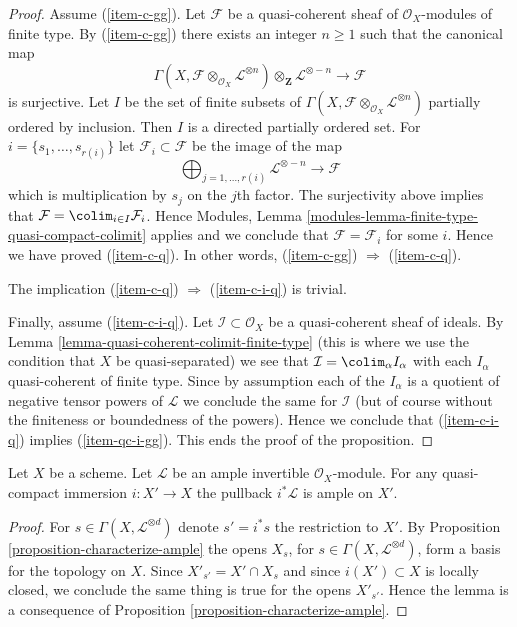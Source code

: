 \begin{proof}
\medskip\noindent
Assume (\ref{item-c-gg}). Let $\mathcal{F}$ be a quasi-coherent
sheaf of $\mathcal{O}_X$-modules of finite type.
By (\ref{item-c-gg}) there exists an integer $n \geq 1$ such that
the canonical map
$$
\Gamma(X, \mathcal{F} \otimes_{\mathcal{O}_X} \mathcal{L}^{\otimes n})
\otimes_{\mathbf{Z}} \mathcal{L}^{\otimes -n}
\longrightarrow
\mathcal{F}
$$
is surjective. Let $I$ be the set of finite subsets of
$\Gamma(X, \mathcal{F} \otimes_{\mathcal{O}_X} \mathcal{L}^{\otimes n})$
partially ordered by inclusion. Then $I$ is a directed partially ordered set.
For $i = \{s_1, \ldots, s_{r(i)}\}$ let $\mathcal{F}_i \subset \mathcal{F}$
be the image of the map
$$
\bigoplus\nolimits_{j = 1, \ldots, r(i)} \mathcal{L}^{\otimes -n}
\longrightarrow
\mathcal{F}
$$
which is multiplication by $s_j$ on the $j$th factor. The surjectivity above
implies that $\mathcal{F} = \colim_{i \in I} \mathcal{F}_i$.
Hence Modules, Lemma \ref{modules-lemma-finite-type-quasi-compact-colimit}
applies and we conclude that
$\mathcal{F} = \mathcal{F}_i$ for some $i$.
Hence we have proved (\ref{item-c-q}). In other words,
(\ref{item-c-gg}) $\Rightarrow$ (\ref{item-c-q}).

\medskip\noindent
The implication (\ref{item-c-q}) $\Rightarrow$ (\ref{item-c-i-q}) is trivial.

\medskip\noindent
Finally, assume (\ref{item-c-i-q}).
Let $\mathcal{I} \subset \mathcal{O}_X$ be a quasi-coherent sheaf
of ideals. By Lemma \ref{lemma-quasi-coherent-colimit-finite-type}
(this is where we use the condition that $X$ be quasi-separated)
we see that $\mathcal{I} = \colim_\alpha I_\alpha$ with
each $I_\alpha$ quasi-coherent of finite type. Since by assumption each of
the $I_\alpha$ is a quotient of negative tensor powers of
$\mathcal{L}$ we conclude the same for $\mathcal{I}$ (but of course
without the finiteness or boundedness of the powers). Hence
we conclude that (\ref{item-c-i-q}) implies (\ref{item-qc-i-gg}).
This ends the proof of the proposition.
\end{proof}

\begin{lemma}
\label{lemma-ample-on-locally-closed}
Let $X$ be a scheme.
Let $\mathcal{L}$ be an ample invertible $\mathcal{O}_X$-module.
For any quasi-compact immersion $i : X' \to X$ the pullback
$i^*\mathcal{L}$ is ample on $X'$.
\end{lemma}

\begin{proof}
For $s \in \Gamma(X, \mathcal{L}^{\otimes d})$ denote
$s' = i^*s$ the restriction to $X'$. By
Proposition \ref{proposition-characterize-ample}
the opens $X_s$, for $s \in \Gamma(X, \mathcal{L}^{\otimes d})$,
form a basis for the topology on $X$. Since $X'_{s'} = X' \cap X_s$
and since $i(X') \subset X$ is locally closed, we conclude
the same thing is true for the opens $X'_{s'}$. Hence
the lemma is a consequence of 
Proposition \ref{proposition-characterize-ample}.
\end{proof}

